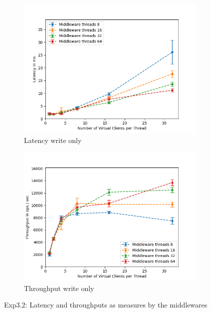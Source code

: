 \documentclass[11pt,a4paper]{article}
\begin{document}
\begin{figure}[H]
\centering
\begin{subfigure}{.5\textwidth}
    \centering
    \includegraphics[width=\textwidth]{img/exp4_1/exp4_1__vc_64__latency_middleware_write_1.png}
    \caption{Latency write only}
    \label{fig:mesh1}
\end{subfigure}%
\begin{subfigure}{.5\textwidth}
      \centering
    \includegraphics[width=\textwidth]{img/exp4_1/exp4_1__vc_64__throughput_middleware_write_1.png}
    \caption{Throughput write only}
    \label{fig:mesh1}
\end{subfigure}
\caption{Exp3.2: Latency and throughputs as measures by the middlewares}
\label{fig:test}
\end{figure}
\end{document}
